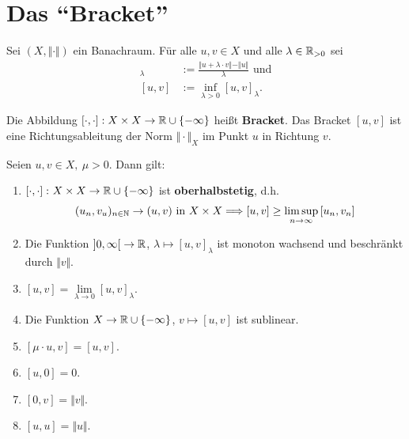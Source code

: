 \section{Das ``Bracket''}
\begin{definition}
	Sei $(X,\Vert\cdot\Vert)$ ein Banachraum. 
	Für alle $u,v\in X$ und alle $\lambda\in\mathbb{R}_{>0}$ sei
	\begin{align*}
		[u,v]_\lambda&:=\frac{\Vert u+\lambda\cdot v\Vert-\Vert u\Vert}{\lambda}\text{ und}\\
		[u,v]&:=\inf\limits_{\lambda>0}[u,v]_\lambda.
	\end{align*}

	Die Abbildung $[\cdot,\cdot]:X\times X\to\mathbb{R}\cup\lbrace-\infty\rbrace$ heißt \textbf{Bracket}. 
	Das Bracket $[u,v]$ ist eine Richtungsableitung der Norm $\Vert\cdot\Vert_X$ im Punkt $u$ in Richtung $v$.
\end{definition}

\begin{lemma}
	Seien $u,v\in X,~\mu>0$. 
	Dann gilt:
	\begin{enumerate}[label=(\roman*)]
		\item $\left[\cdot,\cdot\right]\colon X\times X\to\mathbb{R}\cup\lbrace-\infty\rbrace$ ist \textbf{oberhalbstetig}, d.h. 
		\begin{align*}
			(u_n,v_u)_{n\in\mathbb{N}}\to(u,v)\text{ in }X\times X\Longrightarrow\left[u,v\right]\geq\limsup_{n\to\infty}\left[u_n,v_n\right]
		\end{align*}

		\item Die Funktion $\left]0,\infty\right[\to\mathbb{R}$, $\lambda\mapsto\left[u,v\right]_\lambda$ ist monoton wachsend und beschränkt durch $\Vert v\Vert$.
		\item $\left[u,v\right]=\lim\limits_{\lambda\to0}\left[u,v\right]_\lambda$.
		\item Die Funktion $X\to\mathbb{R}\cup\lbrace-\infty\rbrace$, $v\mapsto\left[u,v\right]$ ist sublinear.
		\item $\left[\mu\cdot u,v\right]=\left[u,v\right]$.
		\item $\left[u,0\right]=0$.
		\item $\left[0,v\right]=\Vert v\Vert$.
		\item $\left[u,u\right]=\Vert u\Vert$.
	\end{enumerate}
\end{lemma}


